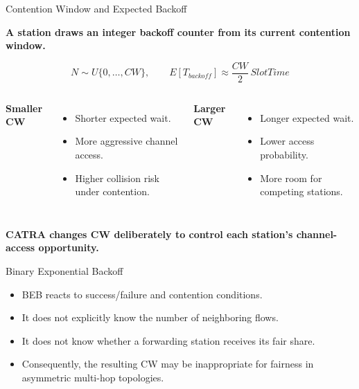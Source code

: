 \begin{frame}{Contention Window and Expected Backoff}
\small
\begin{center}
\textbf{A station draws an integer backoff counter from its current contention window.}
\end{center}
\[
N\sim U\{0,\ldots,CW\},\qquad
E[T_{backoff}]\approx \frac{CW}{2}\,SlotTime
\]
\begin{columns}[T,onlytextwidth]
\textbf{Smaller CW}
\begin{itemize}
\item Shorter expected wait.
\item More aggressive channel access.
\item Higher collision risk under contention.
\end{itemize}
\textbf{Larger CW}
\begin{itemize}
\item Longer expected wait.
\item Lower access probability.
\item More room for competing stations.
\end{itemize}
\end{columns}
\vspace{0.02cm}
\begin{center}
\textbf{CATRA changes CW deliberately to control each station's channel-access opportunity.}
\end{center}
\end{frame}

\begin{frame}{Binary Exponential Backoff}
\begin{center}
\end{center}
\vspace{0.35cm}
\begin{itemize}
\item BEB reacts to success/failure and contention conditions.
\item It does not explicitly know the number of neighboring flows.
\item It does not know whether a forwarding station receives its fair share.
\item Consequently, the resulting CW may be inappropriate for fairness in asymmetric multi-hop topologies.
\end{itemize}
\end{frame}

